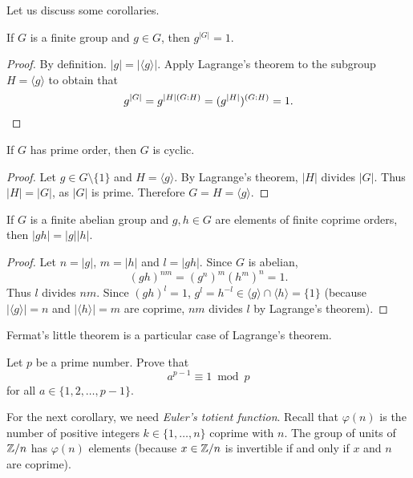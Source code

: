 Let us discuss some corollaries. 

\begin{corollary}
    If $G$ is a finite group and $g\in G$, then $g^{|G|}=1$.
\end{corollary}

\begin{proof}
    By definition. $|g|=|\langle g\rangle|$. Apply Lagrange's theorem 
    to the subgroup $H=\langle g\rangle$ to obtain that 
    \[
            g^{|G|}=g^{|H|(G:H)}=(g^{|H|})^{(G:H)}=1.\qedhere
    \]
\end{proof}

\begin{corollary}
    If $G$ has prime order, then $G$ is cyclic. 
\end{corollary}

\begin{proof}
    Let $g\in G\setminus\{1\}$ and $H=\langle g\rangle$. By Lagrange's theorem, 
    $|H|$ divides $|G|$. Thus $|H|=|G|$, as $|G|$ is prime. Therefore 
    $G=H=\langle g\rangle$.
\end{proof}

\begin{corollary}
\label{cor:coprime_orders}
    If $G$ is a finite abelian group and $g,h\in G$ are elements of finite coprime orders, 
    then 
    $|gh|=|g||h|$.
\end{corollary}

\begin{proof}
    Let $n=|g|$, $m=|h|$ and $l=|gh|$. Since $G$ is abelian,
    \[
    (gh)^{nm}=(g^n)^m(h^m)^n=1. 
    \]
    Thus $l$ divides $nm$. Since $(gh)^l=1$,
    $g^l=h^{-l}\in \langle g\rangle\cap\langle h\rangle=\{1\}$ 
    (because $|\langle g\rangle|=n$ and $|\langle h\rangle|=m$ are coprime, 
    $nm$ divides $l$ by Lagrange's theorem).
\end{proof}

Fermat's little theorem is a particular case of Lagrange's theorem. 

\begin{exercise}
    Let $p$ be a prime number. Prove that 
    \[a^{p-1}\equiv1\bmod p
    \]
    for all $a\in\{1,2,\dots,p-1\}$.
\end{exercise}

For the next corollary, we need \emph{Euler's totient function}. 
Recall that 
$\varphi(n)$ is the number of positive integers $k\in\{1,\dots,n\}$
coprime with $n$. The group of units of 
$\mathbb{Z}/n$ has $\varphi(n)$ elements (because $x\in\mathbb{Z}/n$ is invertible
if and only if $x$ and $n$ are coprime).

